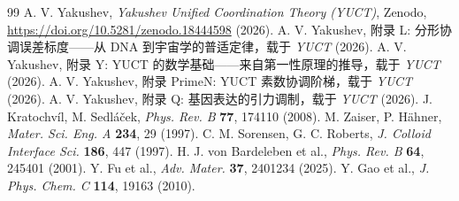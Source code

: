 \documentclass[12pt,a4paper]{article}
\begin{document}
	\begin{thebibliography}{99}
		A. V. Yakushev, \emph{Yakushev Unified Coordination Theory (YUCT)}, Zenodo, \url{https://doi.org/10.5281/zenodo.18444598} (2026).
		A. V. Yakushev, 附录 L: 分形协调误差标度——从 DNA 到宇宙学的普适定律，载于 \emph{YUCT} (2026).
		A. V. Yakushev, 附录 Y: YUCT 的数学基础——来自第一性原理的推导，载于 \emph{YUCT} (2026).
		A. V. Yakushev, 附录 PrimeN: YUCT 素数协调阶梯，载于 \emph{YUCT} (2026).
		A. V. Yakushev, 附录 Q: 基因表达的引力调制，载于 \emph{YUCT} (2026).
		J. Kratochv\'il, M. Sedl\'a\v{c}ek, \emph{Phys. Rev. B} \textbf{77}, 174110 (2008).
		M. Zaiser, P. H\"ahner, \emph{Mater. Sci. Eng. A} \textbf{234}, 29 (1997).
		C. M. Sorensen, G. C. Roberts, \emph{J. Colloid Interface Sci.} \textbf{186}, 447 (1997).
		H. J. von Bardeleben et al., \emph{Phys. Rev. B} \textbf{64}, 245401 (2001).
		Y. Fu et al., \emph{Adv. Mater.} \textbf{37}, 2401234 (2025).
		Y. Gao et al., \emph{J. Phys. Chem. C} \textbf{114}, 19163 (2010).
	\end{thebibliography}
	
\end{document}
